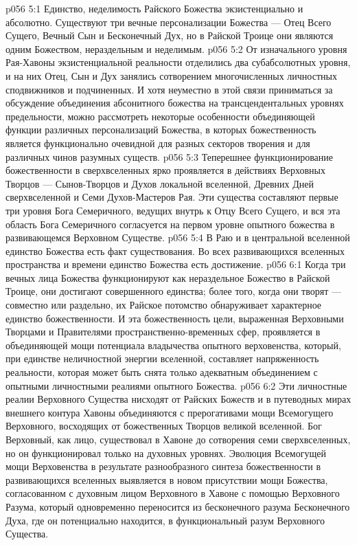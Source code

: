 \vs p056 5:1 Единство, неделимость Райского Божества экзистенциально и абсолютно. Существуют три вечные персонализации Божества --- Отец Всего Сущего, Вечный Сын и Бесконечный Дух, но в Райской Троице они  являются одним Божеством, нераздельным и неделимым.
\vs p056 5:2 \pc От изначального уровня Рая\hyp{}Хавоны экзистенциальной реальности отделились два субабсолютных уровня, и на них Отец, Сын и Дух занялись сотворением многочисленных личностных сподвижников и подчиненных. И хотя неуместно в этой связи приниматься за обсуждение объединения абсонитного божества на трансцендентальных уровнях предельности, можно рассмотреть некоторые особенности объединяющей функции различных персонализаций Божества, в которых божественность является функционально очевидной для разных секторов творения и для различных чинов разумных существ.
\vs p056 5:3 Теперешнее функционирование божественности в сверхвселенных ярко проявляется в действиях Верховных Творцов --- Сынов\hyp{}Творцов и Духов локальной вселенной, Древних Дней сверхвселенной и Семи Духов\hyp{}Мастеров Рая. Эти существа составляют первые три уровня Бога Семеричного, ведущих внутрь к Отцу Всего Сущего, и вся эта область Бога Семеричного согласуется на первом уровне опытного божества в развивающемся Верховном Существе.
\vs p056 5:4 \pc В Раю и в центральной вселенной единство Божества есть факт существования. Во всех развивающихся вселенных пространства и времени единство Божества есть достижение.
\vs p056 6:1 Когда три вечных лица Божества функционируют как нераздельное Божество в Райской Троице, они достигают совершенного единства; более того, когда они творят --- совместно или раздельно, их Райское потомство обнаруживает характерное единство божественности. И эта божественность цели, выраженная Верховными Творцами и Правителями пространственно\hyp{}временных сфер, проявляется в объединяющей мощи потенциала владычества опытного верховенства, который, при единстве неличностной энергии вселенной, составляет напряженность реальности, которая может быть снята только адекватным объединением с опытными личностными реалиями опытного Божества.
\vs p056 6:2 Эти личностные реалии Верховного Существа нисходят от Райских Божеств и в путеводных мирах внешнего контура Хавоны объединяются с прерогативами мощи Всемогущего Верховного, восходящих от божественных Творцов великой вселенной. Бог Верховный, как лицо, существовал в Хавоне до сотворения семи сверхвселенных, но он функционировал только на духовных уровнях. Эволюция Всемогущей мощи Верховенства в результате разнообразного синтеза божественности в развивающихся вселенных выявляется в новом присутствии мощи Божества, согласованном с духовным лицом Верховного в Хавоне с помощью Верховного Разума, который одновременно переносится из бесконечного разума Бесконечного Духа, где он потенциально находится, в функциональный разум Верховного Существа.
